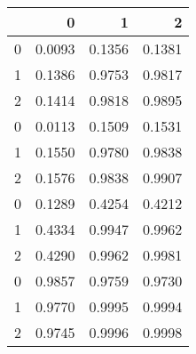 \begin{tabular}{lrrr}
\toprule
{} &       0 &       1 &       2 \\
\midrule
0 &  0.0093 &  0.1356 &  0.1381 \\
1 &  0.1386 &  0.9753 &  0.9817 \\
2 &  0.1414 &  0.9818 &  0.9895 \\
0 &  0.0113 &  0.1509 &  0.1531 \\
1 &  0.1550 &  0.9780 &  0.9838 \\
2 &  0.1576 &  0.9838 &  0.9907 \\
0 &  0.1289 &  0.4254 &  0.4212 \\
1 &  0.4334 &  0.9947 &  0.9962 \\
2 &  0.4290 &  0.9962 &  0.9981 \\
0 &  0.9857 &  0.9759 &  0.9730 \\
1 &  0.9770 &  0.9995 &  0.9994 \\
2 &  0.9745 &  0.9996 &  0.9998 \\
\bottomrule
\end{tabular}
